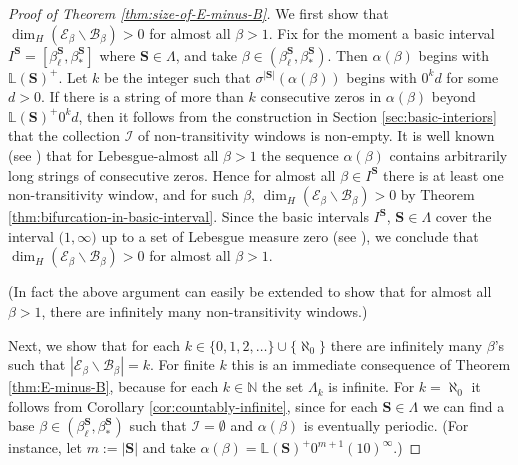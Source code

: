 \documentclass[11pt]{amsart}
\theoremstyle{definition}
\theoremstyle{remark}
\numberwithin{equation}{section}
\newcommand{\N}{\ensuremath{\mathbb{N}}}
\renewcommand{\L}{\ensuremath{\mathbb{L}}}
\newcommand{\BB}{\mathscr{B}}
\newcommand{\EE}{\mathscr{E}}
\newcommand{\II}{\mathcal{I}}
\newcommand{\cs}{ {\mathbf{S}}}
\newcommand{\f}{\infty}
\newcommand{\al}{\alpha}
\newcommand{\si}{\sigma}
\newcommand{\La}{\Lambda}
\begin{document}
\begin{proof}[Proof of Theorem \ref{thm:size-of-E-minus-B}]
We first show that $\dim_H(\EE_\beta\backslash\BB_\beta)>0$ for almost all $\beta{>1}$. Fix for the moment a basic interval $I^\cs=[\beta_\ell^\cs,\beta_*^\cs]$ where $\cs\in\La$, and take $\beta\in(\beta_\ell^\cs,\beta_*^\cs)$. Then $\al(\beta)$ begins with $\L(\cs)^+$. Let $k$ be the integer such that $\si^{|\cs|}(\al(\beta))$ begins with {$0^k d$ for some $d>0$}. If there is a string of more than $k$ consecutive zeros in $\al(\beta)$ beyond $\L(\cs)^+{0^k d}$, then it follows from the construction in Section \ref{sec:basic-interiors} that the collection $\II$ of non-transitivity windows is non-empty. It is well known (see \cite[p.~678]{Schmeling-97}) that for Lebesgue-almost all $\beta{>1}$ the sequence $\al(\beta)$ contains arbitrarily long strings of consecutive zeros. Hence for almost all $\beta\in I^\cs$ there is at least one non-transitivity window, and for such $\beta$, $\dim_H(\EE_\beta\backslash\BB_\beta)>0$ by Theorem \ref{thm:bifurcation-in-basic-interval}. Since the basic intervals $I^\cs$, $\cs\in\La$ cover the interval $(1,{\f)}$ up to a set of Lebesgue measure zero (see \cite{Allaart-Kong-2021}), we conclude that $\dim_H(\EE_\beta\backslash\BB_\beta)>0$ for almost all $\beta{>1}$.

(In fact the above argument can easily be extended to show that for almost all $\beta{>1}$, there are infinitely many non-transitivity windows.)

Next, we show that for each $k\in\{0,1,2,\dots\}\cup\{\aleph_0\}$ there are infinitely many $\beta$'s such that $|\EE_\beta\backslash\BB_\beta|=k$. For finite $k$ this is an immediate consequence of Theorem \ref{thm:E-minus-B}, because for each $k\in\N$ the set $\La_k$ is infinite. For $k=\aleph_0$ it follows from Corollary \ref{cor:countably-infinite}, since for each $\cs\in\La$ we can find a base $\beta\in (\beta_\ell^\cs,\beta_*^\cs)$ such that $\II=\emptyset$ and $\al(\beta)$ is eventually periodic. (For instance, let $m:=|\cs|$ and take $\al(\beta)=\L(\cs)^+0^{m+1}(10)^\f$.)


\end{proof}
\end{document}
